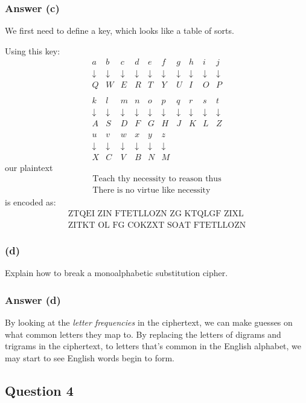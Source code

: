 \documentclass{article}
\begin{document}
	\subsubsection*{Answer (c)}
	We first need to define a key, which looks like a table of sorts.
	
	Using this key:
	\[
	\begin{matrix}
	a&b&c&d&e&f&g&h&i&j \\ 
	\downarrow&\downarrow&\downarrow&\downarrow&\downarrow&\downarrow&\downarrow&\downarrow&\downarrow&\downarrow \\
	Q&W&E&R&T&Y&U&I&O&P \\ \\
	k&l&m&n&o&p&q&r&s&t \\ 
	\downarrow&\downarrow&\downarrow&\downarrow&\downarrow&\downarrow&\downarrow&\downarrow&\downarrow&\downarrow \\
	A&S&D&F&G&H&J&K&L&Z \\ \\
	u&v&w&x&y&z \\
	\downarrow&\downarrow&\downarrow&\downarrow&\downarrow&\downarrow \\
	X&C&V&B&N&M 
	\end{matrix}
	\]
	our plaintext
	\[
	\begin{split}
	\text{Teach thy necessity to reason thus} \\
	\text{There is no virtue like necessity}
	\end{split}
	\] 
	is encoded as:
	\[
	\begin{split}
	\text{ZTQEI ZIN FTETLLOZN ZG KTQLGF ZIXL} \\
	\text{ZITKT OL FG COKZXT SOAT FTETLLOZN}
	\end{split}
	\]
	\subsubsection*{(d)}
	 Explain how to break a monoalphabetic substitution cipher.
	
	\subsubsection*{Answer (d)}
	By looking at the \textit{letter frequencies} in the ciphertext, we can make guesses on what common letters they map to. By replacing the letters of digrams and trigrams in the ciphertext, to letters that's common in the English alphabet, we may start to see English words begin to form.
	
	\subsection*{Question 4}
\end{document}

